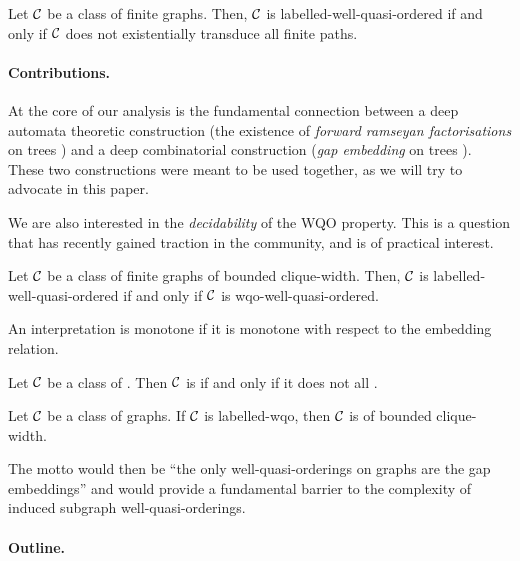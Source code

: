 \begin{conjecture}
    \label{transduction:conj}
    Let $\mathcal{C}$ be a class of finite graphs.
    Then, $\mathcal{C}$ is labelled-well-quasi-ordered
    if and only if
    $\mathcal{C}$
    does not existentially transduce all finite paths.
\end{conjecture}


\paragraph*{Contributions.} At the core of our analysis is the fundamental
connection between a deep automata theoretic construction (the existence of
\emph{forward ramseyan factorisations} on trees \cite{COLC07}) and a deep
combinatorial construction (\emph{gap embedding} on trees
\cite{DERSHOWITZ200380}). These two constructions were meant to be used
together, as we will try to advocate in this paper.

We are also interested in the \emph{decidability} of the WQO property. This is
a question that has recently gained traction in the community, and is of
practical interest.

\begin{theorem}[restate=pouzet2:thm]
    \label{pouzet-2:thm}
    Let $\mathcal{C}$ be a class of finite graphs of bounded clique-width.
    Then, $\mathcal{C}$ is labelled-well-quasi-ordered
    if and only if 
    $\mathcal{C}$ is wqo-well-quasi-ordered.
\end{theorem}

An interpretation is monotone if it is monotone with respect to the
embedding relation.

\begin{theorem}[restate=transductions-paths:thm,label={transductions-paths:thm}]
    \label{transductions-paths:thm}
    Let $\mathcal{C}$ be a class of .
    Then $\mathcal{C}$ is 
    if and only if
    it does not 
    all .
\end{theorem}


\begin{conjecture}
    \label{nip-cw:conj}
    Let $\mathcal{C}$ be a class of graphs.
    If $\mathcal{C}$ is labelled-wqo,
    then $\mathcal{C}$ is of bounded clique-width.
\end{conjecture}

The motto would then be ``the only well-quasi-orderings on graphs are the gap
embeddings'' and would provide a fundamental barrier to the complexity of
induced subgraph well-quasi-orderings.

\paragraph*{Outline.}
